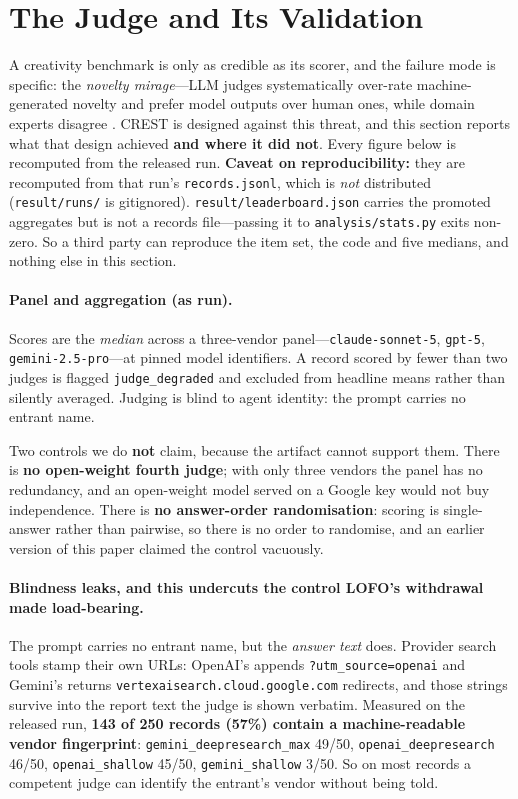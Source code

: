 \section{The Judge and Its Validation}
\label{sec:judge}

A creativity benchmark is only as credible as its scorer, and the failure mode is specific: the \emph{novelty mirage}---LLM judges systematically over-rate machine-generated novelty and prefer model outputs over human ones, while domain experts disagree \citep{sinhahajari2026mirage}. CREST is designed against this threat, and this section reports what that design achieved \textbf{and where it did not}. Every figure below is recomputed from the released run. \textbf{Caveat on reproducibility:} they are recomputed from that run's \texttt{records.jsonl}, which is \emph{not} distributed (\texttt{result/runs/} is gitignored). \texttt{result/leaderboard.json} carries the promoted aggregates but is not a records file---passing it to \texttt{analysis/stats.py} exits non-zero. So a third party can reproduce the item set, the code and five medians, and nothing else in this section.

\paragraph{Panel and aggregation (as run).} Scores are the \emph{median} across a three-vendor panel---\texttt{claude-sonnet-5}, \texttt{gpt-5}, \texttt{gemini-2.5-pro}---at pinned model identifiers. A record scored by fewer than two judges is flagged \texttt{judge\_degraded} and excluded from headline means rather than silently averaged. Judging is blind to agent identity: the prompt carries no entrant name.

Two controls we do \textbf{not} claim, because the artifact cannot support them. There is \textbf{no open-weight fourth judge}; with only three vendors the panel has no redundancy, and an open-weight model served on a Google key would not buy independence. There is \textbf{no answer-order randomisation}: scoring is single-answer rather than pairwise, so there is no order to randomise, and an earlier version of this paper claimed the control vacuously.

\paragraph{Blindness leaks, and this undercuts the control LOFO's withdrawal made load-bearing.} The prompt carries no entrant name, but the \emph{answer text} does. Provider search tools stamp their own URLs: OpenAI's appends \texttt{?utm\_source=openai} and Gemini's returns \texttt{vertexaisearch.cloud.google.com} redirects, and those strings survive into the report text the judge is shown verbatim. Measured on the released run, \textbf{143 of 250 records (57\%) contain a machine-readable vendor fingerprint}: \texttt{gemini\_deepresearch\_max} 49/50, \texttt{openai\_deepresearch} 46/50, \texttt{openai\_shallow} 45/50, \texttt{gemini\_shallow} 3/50. So on most records a competent judge can identify the entrant's vendor without being told.

